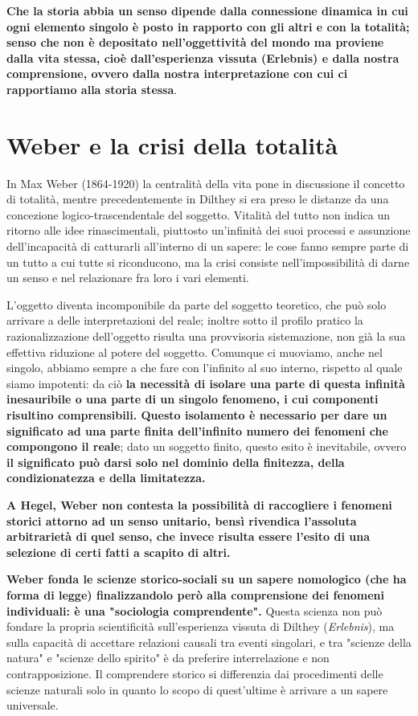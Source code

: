 \textbf{Che la storia abbia un senso dipende dalla connessione dinamica in cui ogni elemento singolo è posto in rapporto con gli altri e con la totalità; senso che non è depositato nell'oggettività del mondo ma proviene dalla vita stessa, cioè dall'esperienza vissuta (Erlebnis) e dalla nostra comprensione, ovvero dalla nostra interpretazione con cui ci rapportiamo alla storia stessa}.

\section{Weber e la crisi della totalità}

In Max Weber (1864-1920) la centralità della vita pone in discussione il concetto di totalità, mentre precedentemente in Dilthey si era preso le distanze da una concezione logico-trascendentale del soggetto. Vitalità del tutto non indica un ritorno alle idee rinascimentali, piuttosto un'infinità dei suoi processi e assunzione dell'incapacità di catturarli all'interno di un sapere: le cose fanno sempre  parte di un tutto a cui tutte si riconducono, ma la crisi consiste nell'impossibilità di darne un senso e nel relazionare fra loro i vari elementi.

L'oggetto diventa incomponibile da parte del soggetto teoretico, che può solo arrivare a delle interpretazioni del reale; inoltre sotto il profilo pratico la razionalizzazione dell'oggetto risulta una provvisoria sistemazione, non già la sua effettiva riduzione al potere del soggetto. Comunque ci muoviamo, anche nel singolo, abbiamo sempre a che fare con l'infinito al suo interno, rispetto al quale siamo impotenti: da ciò \textbf{la necessità di isolare una parte di questa infinità inesauribile o una parte di un singolo fenomeno, i cui componenti risultino comprensibili. Questo isolamento è necessario per dare un significato ad una parte finita dell'infinito numero dei fenomeni che compongono il reale}; dato un soggetto finito, questo esito è inevitabile, ovvero \textbf{il significato può darsi solo nel dominio della finitezza, della condizionatezza e della limitatezza.}

\textbf{A Hegel, Weber non contesta la possibilità di raccogliere i fenomeni storici attorno ad un senso unitario, bensì rivendica l'assoluta arbitrarietà di quel senso, che invece risulta essere l'esito di una selezione di certi fatti a scapito di altri.}

\textbf{Weber fonda le scienze storico-sociali su un sapere nomologico (che ha forma di legge) finalizzandolo  però alla comprensione dei fenomeni individuali: è una "sociologia comprendente".} Questa scienza non può fondare la propria scientificità sull'esperienza vissuta di Dilthey (\textit{Erlebnis}), ma sulla capacità di accettare relazioni causali tra eventi singolari, e tra "scienze della natura" e "scienze dello spirito" è da preferire interrelazione e non contrapposizione. Il comprendere storico si differenzia dai procedimenti delle scienze naturali solo in quanto lo scopo di quest'ultime è arrivare a un sapere universale.

